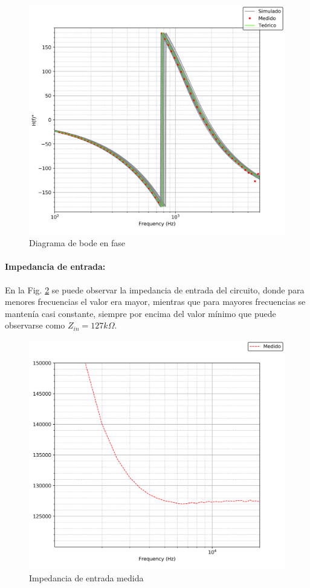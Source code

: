 \begin{figure}[H]
	\centering
	\includegraphics[scale=0.7]{../EJ1/Recursos/bessel_bode_fase.png}
	\caption{Diagrama de bode en fase}
	\label{fig:bessel_bode_fase}
\end{figure}

\paragraph{Impedancia de entrada:} En la Fig. \ref{bessel_impedancia_entrada} se puede observar la impedancia de entrada del circuito, donde para menores frecuencias
el valor era mayor, mientras que para mayores frecuencias se manten\'ia casi constante, siempre por encima del valor m\'inimo que puede observarse como $Z_{in} = 127k\Omega$.

\begin{figure}[H]
	\centering
	\includegraphics[scale=0.1]{../EJ1/Recursos/bessel_impedancia_entrada.png}
	\caption{Impedancia de entrada medida}
	\label{bessel_impedancia_entrada}
\end{figure}

